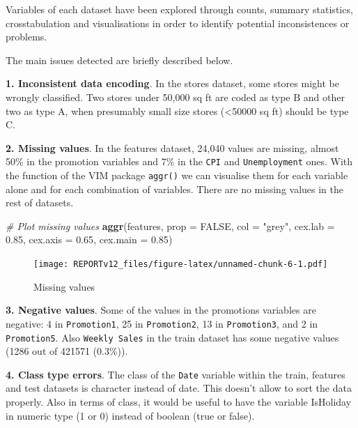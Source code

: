 \documentclass[11pt,]{article}
\newenvironment{Shaded}{\begin{snugshade}}{\end{snugshade}}
\newcommand{\KeywordTok}[1]{\textcolor[rgb]{0.13,0.29,0.53}{\textbf{{#1}}}}
\newcommand{\DataTypeTok}[1]{\textcolor[rgb]{0.13,0.29,0.53}{{#1}}}
\newcommand{\FloatTok}[1]{\textcolor[rgb]{0.00,0.00,0.81}{{#1}}}
\newcommand{\StringTok}[1]{\textcolor[rgb]{0.31,0.60,0.02}{{#1}}}
\newcommand{\CommentTok}[1]{\textcolor[rgb]{0.56,0.35,0.01}{\textit{{#1}}}}
\newcommand{\OtherTok}[1]{\textcolor[rgb]{0.56,0.35,0.01}{{#1}}}
\newcommand{\NormalTok}[1]{{#1}}
\begin{document}
Variables of each dataset have been explored through counts, summary
statistics, crosstabulation and visualisations in order to identify
potential inconsistences or problems.

The main issues detected are briefly described below.

\textbf{1. Inconsistent data encoding}. In the stores dataset, some
stores might be wrongly classified. Two stores under 50,000 sq ft are
coded as type B and other two as type A, when presumably small size
stores (\textless{}50000 sq ft) should be type C.

\textbf{2. Missing values}. In the features dataset, 24,040 values are
missing, almost 50\% in the promotion variables and 7\% in the
\texttt{CPI} and \texttt{Unemployment} ones. With the function of the
VIM package \texttt{aggr()} we can visualise them for each variable
alone and for each combination of variables. There are no missing values
in the rest of datasets.

\begin{Shaded}
\begin{Highlighting}[]
\CommentTok{# Plot missing values}
\KeywordTok{aggr}\NormalTok{(features, }\DataTypeTok{prop =} \OtherTok{FALSE}\NormalTok{, }\DataTypeTok{col =} \StringTok{"grey"}\NormalTok{, }\DataTypeTok{cex.lab =} \FloatTok{0.85}\NormalTok{, }\DataTypeTok{cex.axis =} \FloatTok{0.65}\NormalTok{, }
    \DataTypeTok{cex.main =} \FloatTok{0.85}\NormalTok{)}
\end{Highlighting}
\end{Shaded}

\begin{figure}[htbp]
\centering
\texttt{[image: REPORTv12\_files/figure-latex/unnamed-chunk-6-1.pdf]}
\caption{Missing values}
\end{figure}

\textbf{3. Negative values}. Some of the values in the promotions
variables are negative: 4 in \texttt{Promotion1}, 25 in
\texttt{Promotion2}, 13 in \texttt{Promotion3}, and 2 in
\texttt{Promotion5}. Also \texttt{Weekly\ Sales} in the train dataset
has some negative values (1286 out of 421571 (0.3\%)).

\textbf{4. Class type errors}. The class of the \texttt{Date} variable
within the train, features and test datasets is character instead of
date. This doesn't allow to sort the data properly. Also in terms of
class, it would be useful to have the variable IsHoliday in numeric type
(1 or 0) instead of boolean (true or false).
\end{document}
